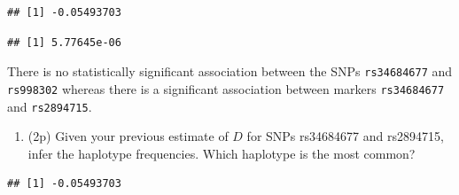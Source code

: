 \documentclass[
]{article}
\newenvironment{Shaded}{\begin{snugshade}}{\end{snugshade}}
\newcommand{\DataTypeTok}[1]{\textcolor[rgb]{0.13,0.29,0.53}{#1}}
\newcommand{\KeywordTok}[1]{\textcolor[rgb]{0.13,0.29,0.53}{\textbf{#1}}}
\newcommand{\NormalTok}[1]{#1}
\newcommand{\OperatorTok}[1]{\textcolor[rgb]{0.81,0.36,0.00}{\textbf{#1}}}
\newcommand{\StringTok}[1]{\textcolor[rgb]{0.31,0.60,0.02}{#1}}
\providecommand{\tightlist}{%
  \setlength{\itemsep}{0pt}\setlength{\parskip}{0pt}}
\begin{document}
\begin{Shaded}
\end{Shaded}

\begin{verbatim}
## [1] -0.05493703
\end{verbatim}

\begin{Shaded}
\end{Shaded}

\begin{verbatim}
## [1] 5.77645e-06
\end{verbatim}

There is no statistically significant association between the SNPs
\texttt{rs34684677} and \texttt{rs998302} whereas there is a significant
association between markers \texttt{rs34684677} and \texttt{rs2894715}.

\begin{enumerate}
\def\labelenumi{\arabic{enumi}.}
\setcounter{enumi}{5}
\tightlist
\item
  (2p) Given your previous estimate of \(D\) for SNPs rs34684677 and
  rs2894715, infer the haplotype frequencies. Which haplotype is the
  most common?
\end{enumerate}

\begin{Shaded}
\end{Shaded}

\begin{verbatim}
## [1] -0.05493703
\end{verbatim}
\end{document}
